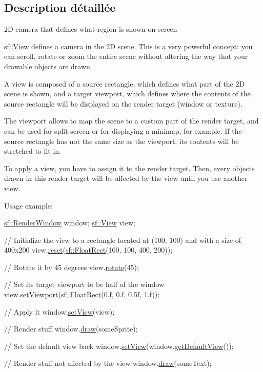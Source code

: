 \subsection{Description détaillée}
2D camera that defines what region is shown on screen 

\hyperlink{classsf_1_1View}{sf\+::\+View} defines a camera in the 2D scene. This is a very powerful concept\+: you can scroll, rotate or zoom the entire scene without altering the way that your drawable objects are drawn.

A view is composed of a source rectangle, which defines what part of the 2D scene is shown, and a target viewport, which defines where the contents of the source rectangle will be displayed on the render target (window or texture).

The viewport allows to map the scene to a custom part of the render target, and can be used for split-\/screen or for displaying a minimap, for example. If the source rectangle has not the same size as the viewport, its contents will be stretched to fit in.

To apply a view, you have to assign it to the render target. Then, every objects drawn in this render target will be affected by the view until you use another view.

Usage example\+: 
\begin{DoxyCode}
\hyperlink{classsf_1_1RenderWindow}{sf::RenderWindow} window;
\hyperlink{classsf_1_1View}{sf::View} view;

\textcolor{comment}{// Initialize the view to a rectangle located at (100, 100) and with a size of 400x200}
view.\hyperlink{classsf_1_1View_ac95b636eafab3922b7e8304fb6c00d7d}{reset}(\hyperlink{classsf_1_1Rect}{sf::FloatRect}(100, 100, 400, 200));

\textcolor{comment}{// Rotate it by 45 degrees}
view.\hyperlink{classsf_1_1View_a5fd3901aae1845586ca40add94faa378}{rotate}(45);

\textcolor{comment}{// Set its target viewport to be half of the window}
view.\hyperlink{classsf_1_1View_a8eaec46b7d332fe834f016d0187d4b4a}{setViewport}(\hyperlink{classsf_1_1Rect}{sf::FloatRect}(0.f, 0.f, 0.5f, 1.f));

\textcolor{comment}{// Apply it}
window.\hyperlink{classsf_1_1RenderTarget_a063db6dd0a14913504af30e50cb6d946}{setView}(view);

\textcolor{comment}{// Render stuff}
window.\hyperlink{classsf_1_1RenderTarget_a12417a3bcc245c41d957b29583556f39}{draw}(someSprite);

\textcolor{comment}{// Set the default view back}
window.\hyperlink{classsf_1_1RenderTarget_a063db6dd0a14913504af30e50cb6d946}{setView}(window.\hyperlink{classsf_1_1RenderTarget_ad3b533c3f899d7044d981ed607aef9be}{getDefaultView}());

\textcolor{comment}{// Render stuff not affected by the view}
window.\hyperlink{classsf_1_1RenderTarget_a12417a3bcc245c41d957b29583556f39}{draw}(someText);
\end{DoxyCode}


